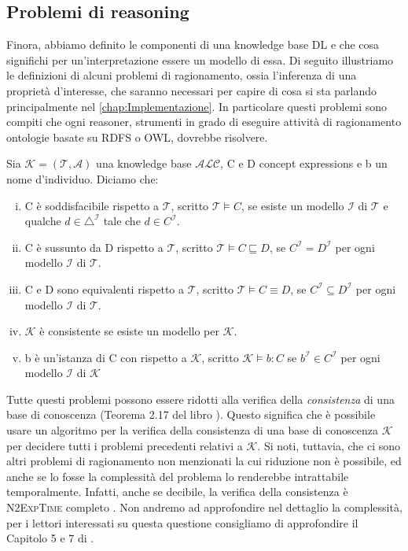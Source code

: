 \subsection[Problemi di reasoning]{Problemi di reasoning}
\label{sec:problemiReasoning}
Finora, abbiamo definito le componenti di una knowledge base DL e che cosa significhi per un'interpretazione essere un modello di essa. Di seguito illustriamo le definizioni di alcuni problemi di ragionamento, ossia l'inferenza di una proprietà d'interesse, che saranno necessari per capire di cosa si sta parlando principalmente nel \autoref{chap:Implementazione}. In particolare questi problemi sono compiti che ogni reasoner, strumenti in grado di eseguire attività di ragionamento ontologie basate su RDFS o OWL, dovrebbe risolvere.
\begin{definition}
	Sia $\mathcal{K} = (\mathcal{T}, \mathcal{A})$ una knowledge base $\mathcal{ALC}$, C e D concept expressions e b un nome d'individuo. Diciamo che:
	\begin{enumerate}[(i)]
		\item C è soddisfacibile rispetto a $\mathcal{T}$, scritto $\mathcal{T} \models C$, se esiste un modello $\mathcal{I}$ di $\mathcal{T}$ e qualche $d \in \triangle^\mathcal{I}$ tale che $d \in C^\mathcal{I}$.
		\item C è sussunto da D rispetto a $\mathcal{T}$, scritto $\mathcal{T} \models C \sqsubseteq D$, se $C^\mathcal{I} = D^\mathcal{I}$ per ogni modello $\mathcal{I}$ di $\mathcal{T}$.
		\item C e D sono equivalenti rispetto a $\mathcal{T}$, scritto $\mathcal{T} \models C \equiv D$, se $C^\mathcal{I} \subseteq D^\mathcal{I}$ per ogni modello $\mathcal{I}$ di $\mathcal{T}$.
		\item $\mathcal{K}$ è consistente se esiste un modello per $\mathcal{K}$.
		\item b è un'istanza di C con rispetto a $\mathcal{K}$, scritto $\mathcal{K} \models b : C$ se $b^\mathcal{I} \in C^\mathcal{I}$ per ogni modello $\mathcal{I}$ di $\mathcal{K}$
	\end{enumerate}
\end{definition}
\noindent
Tutte questi problemi possono essere ridotti alla verifica della \textit{consistenza} di una base di conoscenza (Teorema 2.17 del libro \cite{baader2017introductionDL}). Questo significa che è possibile usare un algoritmo per la verifica della consistenza di una base di conoscenza $\mathcal{K}$ per decidere tutti i problemi precedenti relativi a $\mathcal{K}$. Si noti, tuttavia, che ci sono altri problemi di ragionamento non menzionati la cui riduzione non è possibile, ed anche se lo fosse la complessità del problema lo renderebbe intrattabile temporalmente. Infatti, anche se decibile, la verifica della consistenza è \textsc{N2ExpTime} completo \cite{baader2017introductionDL}. Non andremo ad approfondire nel dettaglio la complessità, per i lettori interessati su questa questione consigliamo di approfondire il Capitolo 5 e 7 di \cite{baader2017introductionDL}.

